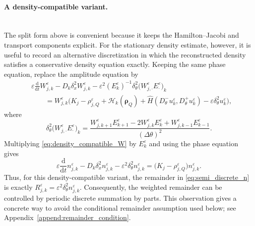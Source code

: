 \documentclass[11pt]{article}
\begin{document}
\paragraph{A density-compatible variant.}\mbox{}\\
The split form above is convenient because it keeps the Hamilton--Jacobi and
transport components explicit. For the stationary density estimate, however,
it is useful to record an alternative discretization in which the reconstructed
density satisfies a conservative density equation exactly. Keeping the same
phase equation, replace the amplitude equation by
\begin{equation}\label{eq:density_compatible_W}
\begin{aligned}
&\varepsilon
\frac{\mathrm d}{\mathrm dt}W_{j,k}^\varepsilon
-
D_k\delta_x^2W_{j,k}^\varepsilon
-
\varepsilon^2(E_k^\varepsilon)^{-1}
\delta_\theta^2
\bigl(W_{j,\cdot}^\varepsilon E_\cdot^\varepsilon\bigr)_k
\\
&\qquad =
W_{j,k}^\varepsilon
\bigl(
K_j-\rho_{j,Q}^\varepsilon
+\mathcal H_k(\boldsymbol\rho_Q)
+\widehat H(D_\theta^-u_k^\varepsilon,D_\theta^+u_k^\varepsilon)
-\varepsilon\delta_\theta^2u_k^\varepsilon
\bigr),
\end{aligned}
\end{equation}
where
\[
\delta_\theta^2
\bigl(W_{j,\cdot}^\varepsilon E_\cdot^\varepsilon\bigr)_k
=
\frac{
W_{j,k+1}^\varepsilon E_{k+1}^\varepsilon
-2W_{j,k}^\varepsilon E_k^\varepsilon
+W_{j,k-1}^\varepsilon E_{k-1}^\varepsilon
}{(\Delta\theta)^2} .
\]
Multiplying \eqref{eq:density_compatible_W} by \(E_k^\varepsilon\) and using
the phase equation gives
\begin{equation}\label{eq:density_compatible_n}
\varepsilon\frac{\mathrm d}{\mathrm dt} n_{j,k}^\varepsilon
-
D_k\delta_x^2 n_{j,k}^\varepsilon
-
\varepsilon^2\delta_\theta^2 n_{j,k}^\varepsilon
=
\bigl(K_j-\rho_{j,Q}^\varepsilon\bigr)n_{j,k}^\varepsilon .
\end{equation}
Thus, for this density-compatible variant, the remainder in
\eqref{eq:semi_discrete_n} is exactly
\(R_{j,k}^\varepsilon=\varepsilon^2\delta_\theta^2n_{j,k}^\varepsilon\).
Consequently, the weighted remainder can be controlled by periodic discrete
summation by parts. This observation gives a concrete way to avoid the
conditional remainder assumption used below; see
Appendix~\ref{append:remainder_condition}.



\end{document}

